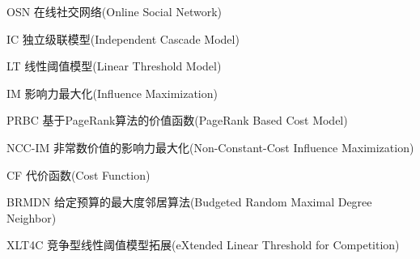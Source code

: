 \begin{denotation}

\item[OSN] 在线社交网络(Online Social Network)
\item[IC] 独立级联模型(Independent Cascade Model)
\item[LT] 线性阈值模型(Linear Threshold Model)
\item[IM] 影响力最大化(Influence Maximization)
\item[PRBC] 基于PageRank算法的价值函数(PageRank Based Cost Model)
\item[NCC-IM] 非常数价值的影响力最大化(Non-Constant-Cost Influence Maximization)
\item[CF] 代价函数(Cost Function)
\item[BRMDN] 给定预算的最大度邻居算法(Budgeted Random Maximal Degree Neighbor)
\item[XLT4C] 竞争型线性阈值模型拓展(eXtended Linear Threshold for Competition)

\end{denotation}
